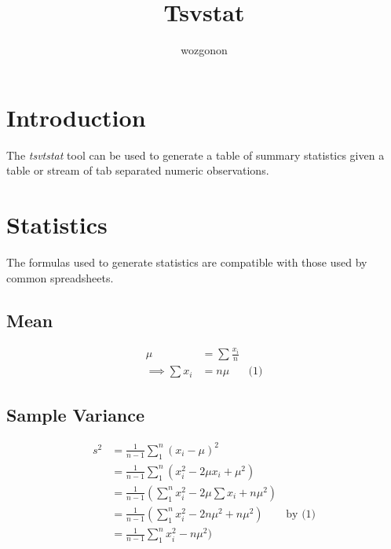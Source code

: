 \documentclass[11pt]{article} %
\title{Tsvstat}
\author{wozgonon}
\date{} %
\begin{document}
\maketitle

\section{Introduction}

The {\it tsvtstat} tool can be used to generate a table of summary statistics given a table or stream of tab separated numeric observations.


\section{Statistics}

The formulas used to generate statistics are compatible with those used by common spreadsheets.

\subsection{Mean}

\begin{align*}
\mu&=\sum \frac{x_i}{n}  \\
\implies  \sum x_i &= n\mu & \text{(1)}
\end{align*}

\subsection{Sample Variance}

\begin{align*}
s^2&= \frac{1}{n-1}\sum_1^n (x_i-\mu)^2 \\
              &=\frac{1}{n-1}\sum_1^n (x_i^2 - 2\mu x_i +\mu^2) \\
              &=\frac{1}{n-1}(\sum_1^n x_i^2 - 2\mu \sum x_i +n\mu^2) \\
              &=\frac{1}{n-1}(\sum_1^n x_i^2 - 2n\mu^2 +n\mu^2) & \text{by (1)}\\
              &=\frac{1}{n-1}\sum_1^n x_i^2 - n\mu^2) \\
\end{align*}
\end{document}
